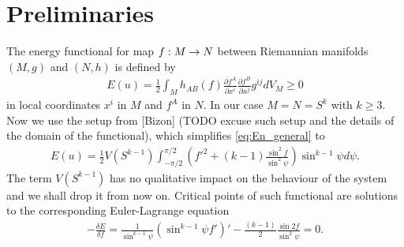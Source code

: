 \section{Preliminaries}
\label{sec:preliminaries}


The energy functional for map $f:M\rightarrow N$ between Riemannian manifolds
$(M,g)$ and $(N,h)$ is defined by
\begin{align}\label{eq:En_general}
  E(u)=\frac{1}{2}\int_M h_{AB}(f)\frac{\partial f^A}{\partial
    x^i}\frac{\partial f^B}{\partial x^j}g^{ij}dV_M\ge0
\end{align}
in local coordinates $x^i$ in $M$ and $f^A$ in $N$. In our case
$M=N=S^k$ with $k\ge3$. Now we use the setup from [Bizon] (TODO excuse
such setup and the details of the domain of the functional), which
simplifies \eqref{eq:En_general} to
\begin{align}
  \label{eq:En_Sk}
  E(u)=\frac{1}{2} V(S^{k-1})\int_{-\pi/2}^{\pi/2}
  \left(f'^2+(k-1)\frac{\sin^2f}{\sin^2\psi}\right) \sin^{k-1}\psi
  d\psi.
\end{align}
The term $V(S^{k-1})$ has no qualitative impact on the behaviour of
the system and we shall drop it from now on. Critical points of such
functional are solutions to the corresponding Euler-Lagrange equation
\begin{align}
  \label{eq:f_psi_EL}
  -\frac{\delta E}{\delta f}=\frac{1}{\sin^{k-1}\psi}\left(\sin^{k-1}\psi
    f'\right)'-\frac{(k-1)}{2}\frac{\sin2f}{\sin^2\psi}=0.
\end{align}

